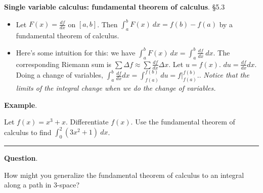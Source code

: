 \documentclass[12pt,letterpaper,noanswers]{exam}
\begin{document}
\noindent\textbf{Single variable calculus: fundamental theorem of calculus}. \S 5.3
\begin{tcolorbox}
\begin{itemize}
\itemsep0em
    \item Let $F(x) = \frac{df}{dx}$ on $[a,b]$.  Then $\displaystyle\int_a^b F(x)\ dx = f(b) - f(a)$ by a fundamental theorem of calculus.
    \item Here's some intuition for this: we have $\displaystyle\int_a^b F(x) \ dx = \int_a^b \frac{df}{dx} \ dx$.  The corresponding Riemann sum is $\displaystyle\sum \Delta f \approx \sum \frac{df}{dx}\Delta x$.  Let $u = f(x)$.  $du = \frac{df}{dx}dx$.  Doing a change of variables, $\displaystyle\int_a^b \frac{df}{dx}dx = \int_{f(a)}^{f(b)} du =  \left.f\right\vert_{f(a)}^{f(b)}.$. \emph{Notice that the limits of the integral change when we do the change of variables.}
\end{itemize}
\end{tcolorbox}

\noindent\textbf{Example}.

Let $f(x) = x^3 + x$.  Differentiate $f(x)$.  Use the fundamental theorem of calculus to find $\displaystyle\int_0^2 \left(3x^2 + 1\right)\ dx$.

\vspace{1in}

\vspace{0.2cm}
\hrule
\vspace{0.2cm}

\noindent\textbf{Question}.

How might you generalize the fundamental theorem of calculus to an integral along a path in 3-space?










\end{document}
